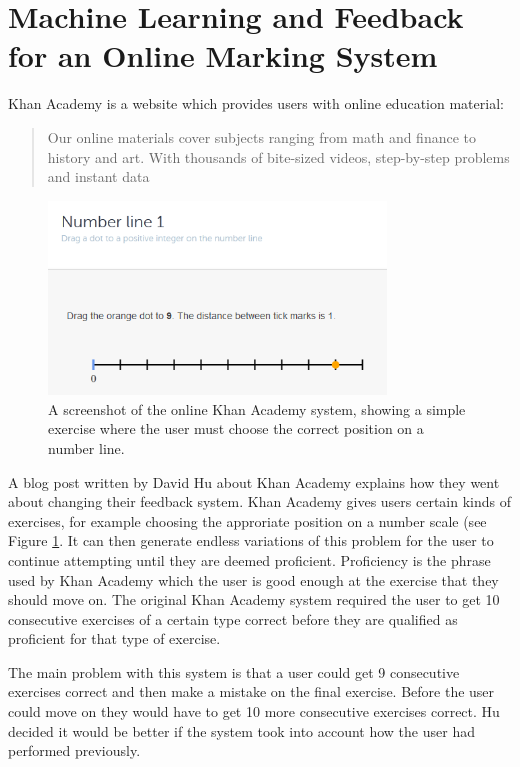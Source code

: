\section{Machine Learning and Feedback for an Online Marking System}
Khan Academy\cite{khan_site} is a website which provides users with online education material:
\begin{quote}
Our online materials cover subjects ranging from math and finance to history and art.  With thousands of bite-sized videos, step-by-step problems and instant data\cite{ka_faq}
\end{quote}

\begin{figure}[h!]
\centering
\includegraphics[width=0.8\textwidth]{images/kascreenshot.png}
\caption{A screenshot of the online Khan Academy system, showing a simple exercise where the user must choose the correct position on a number line.}
\label{fig:kascreenshot}
\end{figure}

A blog post\cite{khan_blog} written by David Hu about Khan Academy explains how they went about changing their feedback system. Khan Academy gives users certain kinds of exercises, for example choosing the approriate position on a number scale (see Figure \ref{fig:kascreenshot}. It can then generate endless variations of this problem for the user to continue attempting until they are deemed proficient. Proficiency is the phrase used by Khan Academy which the user is good enough at the exercise that they should move on. The original Khan Academy system required the user to get 10 consecutive exercises of a certain type correct before they are qualified as proficient for that type of exercise. 

The main problem with this system is that a user could get 9 consecutive exercises correct and then make a mistake on the final exercise. Before the user could move on they would have to get 10 more consecutive exercises correct. Hu decided it would be better if the system took into account how the user had performed previously. 

